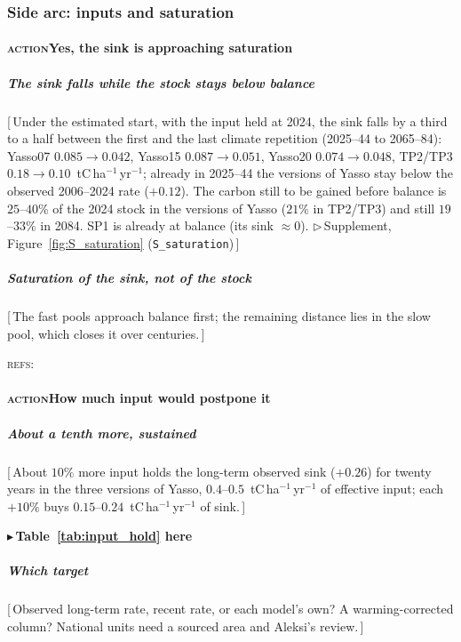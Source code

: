 \documentclass[11pt]{article}
\newcounter{subsubparagraph}[subparagraph]
\newcommand{\beat}[1]{\textcolor{black!45}{\textsc{\small #1}}\enspace}
\newcommand{\gap}[1]{\textcolor{red!70!black}{\small[\,#1\,]}}
\newcommand{\refs}[1]{\par\textcolor{red!70!black}{\footnotesize\textsc{refs:}\ #1}\par}
\newcommand{\suppanchor}[2]{\textcolor{red!70!black}{\small$\triangleright$\,Supplement,
  Figure~\ref{fig:#1} (\texttt{#2})}}
\begin{document}
\subsubsection{Side arc: inputs and saturation}
\paragraph{\beat{action}Yes, the sink is approaching saturation}
\subparagraph{The sink falls while the stock stays below balance}
\gap{Under the estimated start, with the input held at 2024, the sink falls by a third to a half
between the first and the last climate repetition (2025--44 to 2065--84): Yasso07 $0.085\to0.042$,
Yasso15 $0.087\to0.051$, Yasso20 $0.074\to0.048$, TP2/TP3 $0.18\to0.10$~tC\,ha$^{-1}$\,yr$^{-1}$;
already in 2025--44 the versions of Yasso stay below the observed 2006--2024 rate ($+0.12$). The
carbon still to be gained before balance is $25$--$40\%$ of the 2024 stock in the versions of Yasso
($21\%$ in TP2/TP3) and still $19$--$33\%$ in 2084. SP1 is already at balance (its sink $\approx0$).
\suppanchor{S_saturation}{S\_saturation}}
\subparagraph{Saturation of the sink, not of the stock}
\gap{The fast pools approach balance first; the remaining distance lies in the slow pool, which
closes it over centuries.}
\refs{\citet{Sierra2018}}
\paragraph{\beat{action}How much input would postpone it}
\subparagraph{About a tenth more, sustained}
\gap{About $10\%$ more input holds the long-term observed sink ($+0.26$) for twenty years in the
three versions of Yasso, $0.4$--$0.5$~tC\,ha$^{-1}$\,yr$^{-1}$ of effective input; each $+10\%$
buys $0.15$--$0.24$~tC\,ha$^{-1}$\,yr$^{-1}$ of sink.}
\par\textcolor{red!70!black}{\small$\blacktriangleright$\,\textbf{Table~\ref{tab:input_hold} here}}\par
\subparagraph{Which target}
\gap{Observed long-term rate, recent rate, or each model's own? A warming-corrected column?
National units need a sourced area and Aleksi's review.}
\end{document}
